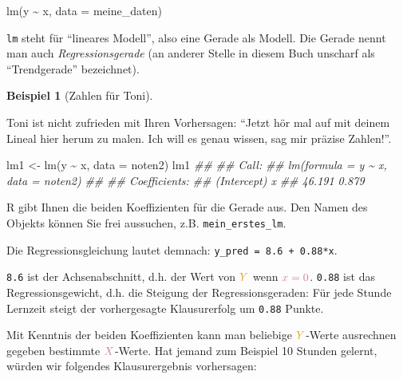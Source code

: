 \documentclass[
  letterpaper,
]{scrbook}
\newenvironment{Shaded}{\begin{snugshade}}{\end{snugshade}}
\newcommand{\AttributeTok}[1]{\textcolor[rgb]{0.40,0.45,0.13}{#1}}
\newcommand{\DocumentationTok}[1]{\textcolor[rgb]{0.37,0.37,0.37}{\textit{#1}}}
\newcommand{\FunctionTok}[1]{\textcolor[rgb]{0.28,0.35,0.67}{#1}}
\newcommand{\NormalTok}[1]{\textcolor[rgb]{0.00,0.23,0.31}{#1}}
\newcommand{\OtherTok}[1]{\textcolor[rgb]{0.00,0.23,0.31}{#1}}
\newcommand{\SpecialCharTok}[1]{\textcolor[rgb]{0.37,0.37,0.37}{#1}}
\theoremstyle{definition}
\theoremstyle{definition}
\newtheorem{example}{Beispiel}[chapter]
\theoremstyle{definition}
\theoremstyle{remark}
\begin{document}
\begin{Shaded}
\begin{Highlighting}[]
\FunctionTok{lm}\NormalTok{(y }\SpecialCharTok{\textasciitilde{}}\NormalTok{ x, }\AttributeTok{data =}\NormalTok{ meine\_daten)}
\end{Highlighting}
\end{Shaded}

\texttt{lm} steht für \enquote{lineares Modell}, also eine Gerade als
Modell. Die Gerade nennt man auch \emph{Regressionsgerade} (an anderer
Stelle in diesem Buch unscharf als \enquote{Trendgerade} bezeichnet).

\begin{example}[Zahlen für
Toni]\protect\hypertarget{exm-noten5}{}\label{exm-noten5}

Toni ist nicht zufrieden mit Ihren Vorhersagen: \enquote{Jetzt hör mal
auf mit deinem Lineal hier herum zu malen. Ich will es genau wissen, sag
mir präzise Zahlen!}.

\end{example}

\begin{Shaded}
\begin{Highlighting}[]
\NormalTok{lm1 }\OtherTok{\textless{}{-}} \FunctionTok{lm}\NormalTok{(y }\SpecialCharTok{\textasciitilde{}}\NormalTok{ x, }\AttributeTok{data =}\NormalTok{ noten2)}
\NormalTok{lm1}
\DocumentationTok{\#\# }
\DocumentationTok{\#\# Call:}
\DocumentationTok{\#\# lm(formula = y \textasciitilde{} x, data = noten2)}
\DocumentationTok{\#\# }
\DocumentationTok{\#\# Coefficients:}
\DocumentationTok{\#\# (Intercept)            x  }
\DocumentationTok{\#\#      46.191        0.879}
\end{Highlighting}
\end{Shaded}

R gibt Ihnen die beiden Koeffizienten für die Gerade aus. Den Namen des
Objekts können Sie frei aussuchen, z.B. \texttt{mein\_erstes\_lm}.

Die Regressionsgleichung lautet demnach:
\texttt{y\_pred\ =\ 8.6\ +\ 0.88*x}.

\texttt{8.6} ist der Achsenabschnitt, d.h. der Wert von
\(\color{ycol}{Y}\) wenn \(\color{xcol}{x}=0\). \texttt{0.88} ist das
Regressionsgewicht, d.h. die Steigung der Regressionsgeraden: Für jede
Stunde Lernzeit steigt der vorhergesagte Klausurerfolg um \texttt{0.88}
Punkte.

Mit Kenntnis der beiden Koeffizienten kann man beliebige
\(\color{ycol}{Y}\)-Werte ausrechnen gegeben bestimmte
\(\color{xcol}{X}\)-Werte. Hat jemand zum Beispiel 10 Stunden gelernt,
würden wir folgendes Klausurergebnis vorhersagen:
\end{document}
